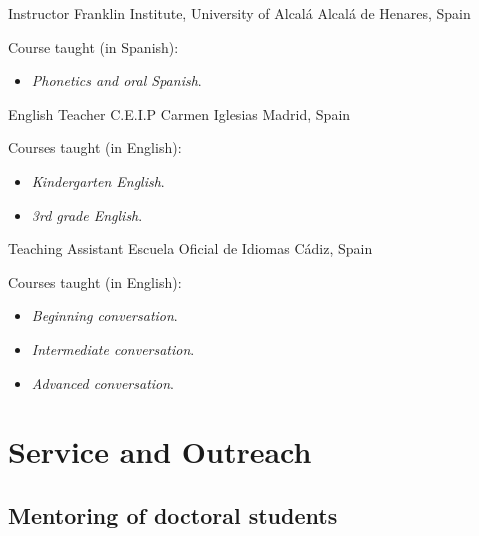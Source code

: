 \documentclass[11pt,letterpaper]{moderncv}
\begin{document}
        {}
        {Instructor}
        {Franklin Institute, University of Alcalá}
        {Alcalá de Henares, Spain}
        {}
        {Course taught (in Spanish):
        \begin{itemize}
          \item[] \small \emph{Phonetics and oral Spanish}.
        \end{itemize}}
        {English Teacher}
        {C.E.I.P Carmen Iglesias}
        {Madrid, Spain}
        {}
        {Courses taught (in English):
        \begin{itemize}
          \item[] \small \emph{Kindergarten English}.\vspace{-.03in}
          \item[] \small \emph{3rd grade English}.
        \end{itemize}}
        {Teaching Assistant}
        {Escuela Oficial de Idiomas}
        {C\'adiz, Spain}
        {}
        {Courses taught (in English):
        \begin{itemize}
          \item[] \small \emph{Beginning conversation}.\vspace{-.03in}
          \item[] \small \emph{Intermediate conversation}.\vspace{-.03in}
          \item[] \small \emph{Advanced conversation}.
        \end{itemize}}











\section{Service and Outreach}

\subsection{Mentoring of doctoral students}
\end{document}
